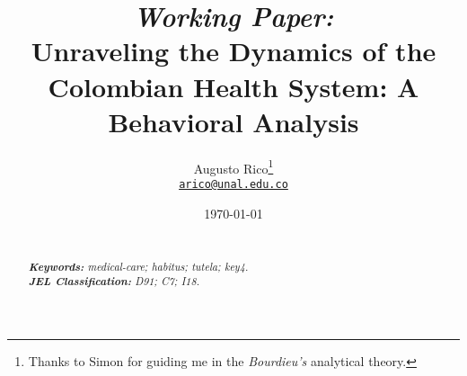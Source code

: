 \documentclass[12pt]{article}
\title{\textit{Working Paper:} \\ %
Unraveling the Dynamics of the Colombian Health System: A Behavioral Analysis %
}
\author{Augusto Rico\thanks{Thanks to Simon for guiding me in the \textit{Bourdieu's} analytical theory.}\\
    \href{mailto:arico@unal.edu.co}{\texttt{arico@unal.edu.co}}
    }
\date{\today}
\begin{document}
{ %
\maketitle
\begin{abstract}
\noindent\lipsum[2] %
~\\
\textit{\textbf{Keywords: }%
medical-care; habitus; tutela; key4.} \\ %
\textit{\textbf{JEL Classification: }%
D91; C7; I18.} %
\end{abstract}}




\end{document}
